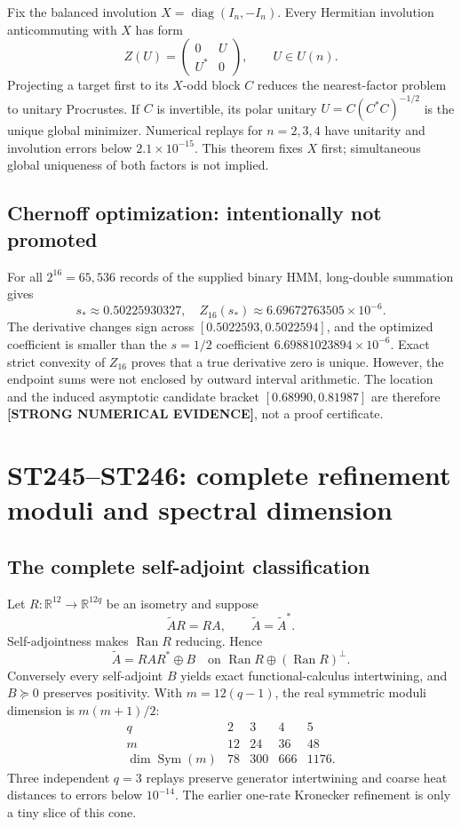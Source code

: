 \documentclass[11pt,a4paper]{article}
\newcommand{\Evidence}{\textcolor{conditional}{\textbf{[STRONG NUMERICAL EVIDENCE]}}}
\newcommand{\R}{\mathbb R}
\newcommand{\diag}{\operatorname{diag}}
\begin{document}
Fix the balanced involution $X=\diag(I_n,-I_n)$. Every Hermitian involution
anticommuting with $X$ has form
\[
Z(U)=\begin{pmatrix}0&U\\U^*&0\end{pmatrix},\qquad U\in U(n).
\]
Projecting a target first to its $X$-odd block $C$ reduces the nearest-factor problem to
unitary Procrustes. If $C$ is invertible, its polar unitary
$U=C(C^*C)^{-1/2}$ is the unique global minimizer. Numerical replays for $n=2,3,4$ have
unitarity and involution errors below $2.1\times10^{-15}$. This theorem fixes $X$ first;
simultaneous global uniqueness of both factors is not implied.

\subsection{Chernoff optimization: intentionally not promoted}

For all $2^{16}=65{,}536$ records of the supplied binary HMM, long-double summation gives
\[
s_*\approx0.50225930327,
\quad
Z_{16}(s_*)\approx6.69672763505\times10^{-6}.
\]
The derivative changes sign across $[0.5022593,0.5022594]$, and the optimized coefficient
is smaller than the $s=1/2$ coefficient $6.69881023894\times10^{-6}$. Exact strict
convexity of $Z_{16}$ proves that a true derivative zero is unique. However, the endpoint
sums were not enclosed by outward interval arithmetic. The location and the induced
asymptotic candidate bracket $[0.68990,0.81987]$ are therefore \Evidence{}, not a proof
certificate.

\section{ST245--ST246: complete refinement moduli and spectral dimension}

\subsection{The complete self-adjoint classification}

Let $R:\R^{12}\to\R^{12q}$ be an isometry and suppose
\[
\widetilde A R=RA,\qquad \widetilde A=\widetilde A^*.
\]
Self-adjointness makes $\operatorname{Ran}R$ reducing. Hence
\[
\boxed{\widetilde A=RAR^*\oplus B
\quad\text{on }\operatorname{Ran}R\oplus(\operatorname{Ran}R)^\perp.}
\]
Conversely every self-adjoint $B$ yields exact functional-calculus intertwining, and
$B\succeq0$ preserves positivity. With $m=12(q-1)$, the real symmetric moduli dimension is
$m(m+1)/2$:
\[
\begin{array}{c|rrrr}
q&2&3&4&5\\ \hline
m&12&24&36&48\\
\dim\operatorname{Sym}(m)&78&300&666&1176.
\end{array}
\]
Three independent $q=3$ replays preserve generator intertwining and coarse heat distances
to errors below $10^{-14}$. The earlier one-rate Kronecker refinement is only a tiny slice
of this cone.
\end{document}
